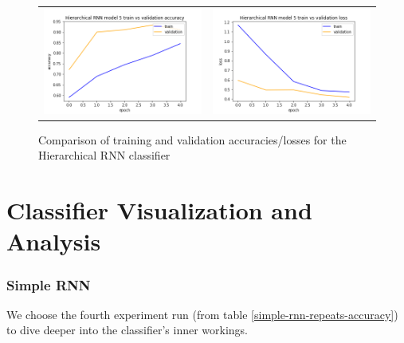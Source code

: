 \begin{figure}
\begin{tabular}{cc}
\includegraphics[width=6.5cm]{images/classifier/model-output-hier-rnn-339/model-5-train-vs-validation-accuracy}&
\includegraphics[width=6.5cm]{images/classifier/model-output-hier-rnn-339/model-5-train-vs-validation-loss}\\

\end{tabular}
    \caption{Comparison of training and validation accuracies/losses for the Hierarchical RNN classifier}
    \label{hier-rnn-acc-loss}
\end{figure}

\section{Classifier Visualization and\\ Analysis}
\label{classifier-visualization}

\subsubsection{Simple RNN} 

We choose the fourth experiment run (from table \ref{simple-rnn-repeats-accuracy}) to dive deeper into the classifier's inner workings.

